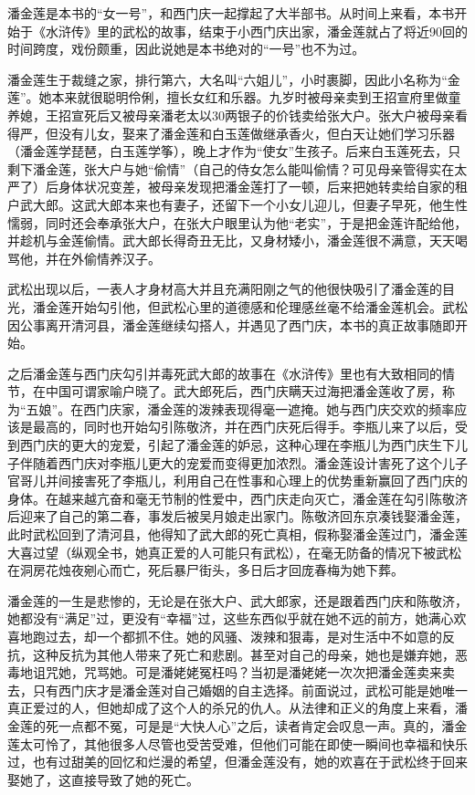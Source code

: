 潘金莲是本书的“女一号”，和西门庆一起撑起了大半部书。从时间上来看，本书开始于《水浒传》里的武松的故事，结束于小西门庆出家，潘金莲就占了将近90回的时间跨度，戏份颇重，因此说她是本书绝对的“一号”也不为过。

潘金莲生于裁缝之家，排行第六，大名叫“六姐儿”，小时裹脚，因此小名称为“金莲”。她本来就很聪明伶俐，擅长女红和乐器。九岁时被母亲卖到王招宣府里做童养媳，王招宣死后又被母亲潘老太以30两银子的价钱卖给张大户。张大户被母亲看得严，但没有儿女，娶来了潘金莲和白玉莲做继承香火，但白天让她们学习乐器（潘金莲学琵琶，白玉莲学筝），晚上才作为“使女”生孩子。后来白玉莲死去，只剩下潘金莲，张大户与她“偷情”（自己的侍女怎么能叫偷情？可见母亲管得实在太严了）后身体状况变差，被母亲发现把潘金莲打了一顿，后来把她转卖给自家的租户武大郎。这武大郎本来也有妻子，还留下一个小女儿迎儿，但妻子早死，他生性懦弱，同时还会奉承张大户，在张大户眼里认为他“老实”，于是把金莲许配给他，并趁机与金莲偷情。武大郎长得奇丑无比，又身材矮小，潘金莲很不满意，天天喝骂他，并在外偷情养汉子。

武松出现以后，一表人才身材高大并且充满阳刚之气的他很快吸引了潘金莲的目光，潘金莲开始勾引他，但武松心里的道德感和伦理感丝毫不给潘金莲机会。武松因公事离开清河县，潘金莲继续勾搭人，并遇见了西门庆，本书的真正故事随即开始。

之后潘金莲与西门庆勾引并毒死武大郎的故事在《水浒传》里也有大致相同的情节，在中国可谓家喻户晓了。武大郎死后，西门庆瞒天过海把潘金莲收了房，称为“五娘”。在西门庆家，潘金莲的泼辣表现得毫一遮掩。她与西门庆交欢的频率应该是最高的，同时也开始勾引陈敬济，并在西门庆死后得手。李瓶儿来了以后，受到西门庆的更大的宠爱，引起了潘金莲的妒忌，这种心理在李瓶儿为西门庆生下儿子伴随着西门庆对李瓶儿更大的宠爱而变得更加浓烈。潘金莲设计害死了这个儿子官哥儿并间接害死了李瓶儿，利用自己在性事和心理上的优势重新赢回了西门庆的身体。在越来越亢奋和毫无节制的性爱中，西门庆走向灭亡，潘金莲在勾引陈敬济后迎来了自己的第二春，事发后被吴月娘走出家门。陈敬济回东京凑钱娶潘金莲，此时武松回到了清河县，他得知了武大郎的死亡真相，假称娶潘金莲过门，潘金莲大喜过望（纵观全书，她真正爱的人可能只有武松），在毫无防备的情况下被武松在洞房花烛夜剜心而亡，死后暴尸街头，多日后才回庞春梅为她下葬。

潘金莲的一生是悲惨的，无论是在张大户、武大郎家，还是跟着西门庆和陈敬济，她都没有“满足”过，更没有“幸福”过，这些东西似乎就在她不远的前方，她满心欢喜地跑过去，却一个都抓不住。她的风骚、泼辣和狠毒，是对生活中不如意的反抗，这种反抗为其他人带来了死亡和悲剧。甚至对自己的母亲，她也是嫌弃她，恶毒地诅咒她，咒骂她。可是潘姥姥冤枉吗？当初是潘姥姥一次次把潘金莲卖来卖去，只有西门庆才是潘金莲对自己婚姻的自主选择。前面说过，武松可能是她唯一真正爱过的人，但她却成了这个人的杀兄的仇人。从法律和正义的角度上来看，潘金莲的死一点都不冤，可是是“大快人心”之后，读者肯定会叹息一声。真的，潘金莲太可怜了，其他很多人尽管也受苦受难，但他们可能在即使一瞬间也幸福和快乐过，也有过甜美的回忆和烂漫的希望，但潘金莲没有，她的欢喜在于武松终于回来娶她了，这直接导致了她的死亡。



